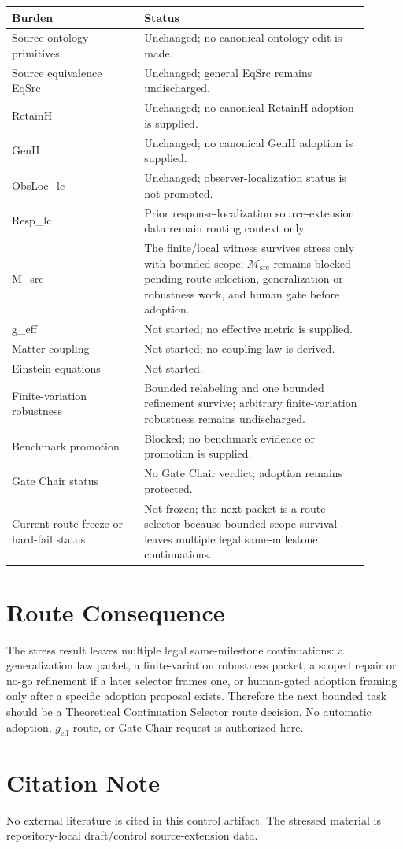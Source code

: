 \documentclass[11pt]{article}
\newcommand{\Msrc}{\mathcal{M}_{\mathrm{src}}}
\newcommand{\geff}{g_{\mathrm{eff}}}
\begin{document}
\begin{center}
\begin{tabular}{p{0.33\linewidth}p{0.57\linewidth}}
\hline
Burden & Status \\
\hline
Source ontology primitives & Unchanged; no canonical ontology edit is made. \\
Source equivalence EqSrc & Unchanged; general EqSrc remains undischarged. \\
RetainH & Unchanged; no canonical RetainH adoption is supplied. \\
GenH & Unchanged; no canonical GenH adoption is supplied. \\
ObsLoc\_lc & Unchanged; observer-localization status is not promoted. \\
Resp\_lc & Prior response-localization source-extension data remain routing context only. \\
M\_src & The finite/local witness survives stress only with bounded scope; \(\Msrc\) remains blocked pending route selection, generalization or robustness work, and human gate before adoption. \\
g\_eff & Not started; no effective metric is supplied. \\
Matter coupling & Not started; no coupling law is derived. \\
Einstein equations & Not started. \\
Finite-variation robustness & Bounded relabeling and one bounded refinement survive; arbitrary finite-variation robustness remains undischarged. \\
Benchmark promotion & Blocked; no benchmark evidence or promotion is supplied. \\
Gate Chair status & No Gate Chair verdict; adoption remains protected. \\
Current route freeze or hard-fail status & Not frozen; the next packet is a route selector because bounded-scope survival leaves multiple legal same-milestone continuations. \\
\hline
\end{tabular}
\end{center}

\section{Route Consequence}

The stress result leaves multiple legal same-milestone continuations: a
generalization law packet, a finite-variation robustness packet, a scoped
repair or no-go refinement if a later selector frames one, or human-gated
adoption framing only after a specific adoption proposal exists. Therefore
the next bounded task should be a Theoretical Continuation Selector route
decision. No automatic adoption, \(\geff\) route, or Gate Chair request is
authorized here.

\section*{Citation Note}

No external literature is cited in this control artifact. The stressed
material is repository-local draft/control source-extension data.
\end{document}
